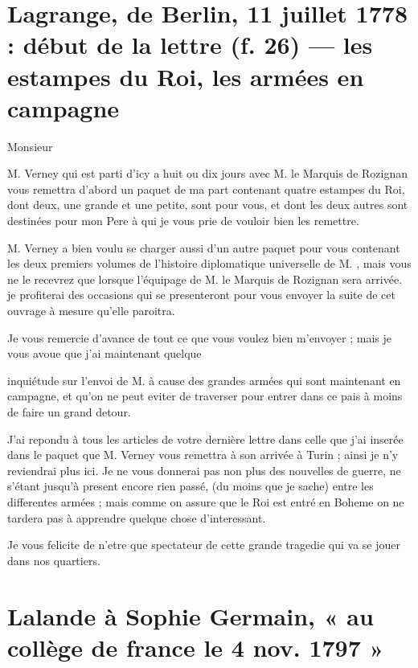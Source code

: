 \documentclass[11pt,a4paper]{article}
\begin{document}
\section{Lagrange, de Berlin, 11 juillet 1778 : début de la lettre (f. 26) — les estampes du Roi, les armées en campagne}

Monsieur

M. Verney qui est parti d'icy a huit ou dix jours avec M. le Marquis de
Rozignan vous remettra d'abord un paquet de ma part contenant quatre estampes
du Roi, dont deux, une grande et une petite, \struck{\ill{}} sont pour vous,
et dont les deux autres sont destinées pour mon Pere à qui je vous prie de
vouloir bien les remettre.

M. Verney a bien voulu se charger aussi d'un autre paquet pour vous contenant
les deux premiers volumes de l'histoire diplomatique universelle de M.
, mais vous ne le recevrez que lorsque l'équipage de M.
le Marquis de Rozignan sera arrivée. je profiterai des occasions qui se
presenteront pour vous envoyer la suite de cet ouvrage à mesure qu'elle
paroitra.

Je vous remercie d'avance de tout ce que vous voulez bien m'envoyer ; mais je
vous avoue que j'ai maintenant quelque

inquiétude sur l'envoi de M.  à cause des grandes armées qui
sont maintenant en campagne, et qu'on ne peut eviter de traverser pour entrer
dans ce pais à moins de faire un grand detour.

J'ai repondu à tous les articles de votre dernière lettre dans celle que j'ai
inserée dans le paquet que M. Verney vous remettra à son arrivée à Turin ;
ainsi je n'y reviendrai plus ici. Je ne vous donnerai pas non plus des
nouvelles de guerre, ne s'étant jusqu'à present encore rien passé, (du moins
que je sache) entre les differentes armées ; mais comme on assure que le Roi
est entré en Boheme \struck{\ill{}} on ne tardera pas à apprendre quelque
chose d'interessant.

Je vous felicite de n'etre que spectateur de cette grande tragedie qui va se
jouer dans nos quartiers.


\section{Lalande à Sophie Germain, « au collège de france le 4 nov. 1797 »}
\end{document}
